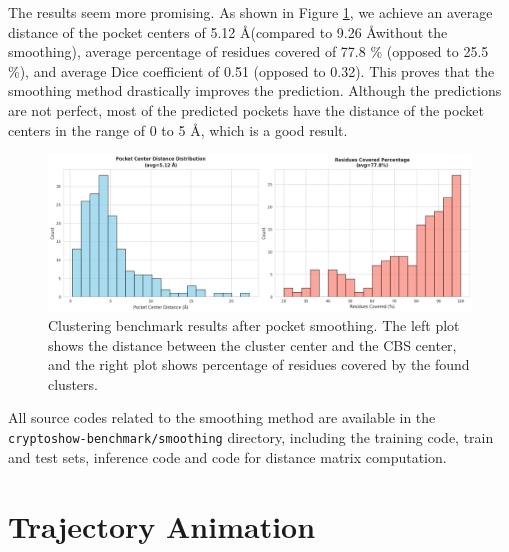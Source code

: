 The results seem more promising. As shown in Figure \ref{fig:clustering-benchmark-smoothened}, we achieve an average distance of the pocket centers of 5.12 \AA (compared to 9.26 \AA without the smoothing), average percentage of residues covered of 77.8 \% (opposed to 25.5 \%), and average Dice coefficient of 0.51 (opposed to 0.32). This proves that the smoothing method drastically improves the prediction.  Although the predictions are not perfect, most of the predicted pockets have the distance of the pocket centers in the range of 0 to 5 \AA, which is a good result.

\begin{figure}[htbp]
    \centering
    \includegraphics[width=\textwidth]{img/smoothened-1.png}
    \caption{Clustering benchmark results after pocket smoothing. The left plot shows the distance between the cluster center and the CBS center, and the right plot shows percentage of residues covered by the found clusters.}
    \label{fig:clustering-benchmark-smoothened}
\end{figure}

All source codes related to the smoothing method are available in the \lstinline!cryptoshow-benchmark/smoothing! directory, including the training code, train and test sets, inference code and code for distance matrix computation.


\section{Trajectory Animation}
\label{sec:trajectory}

